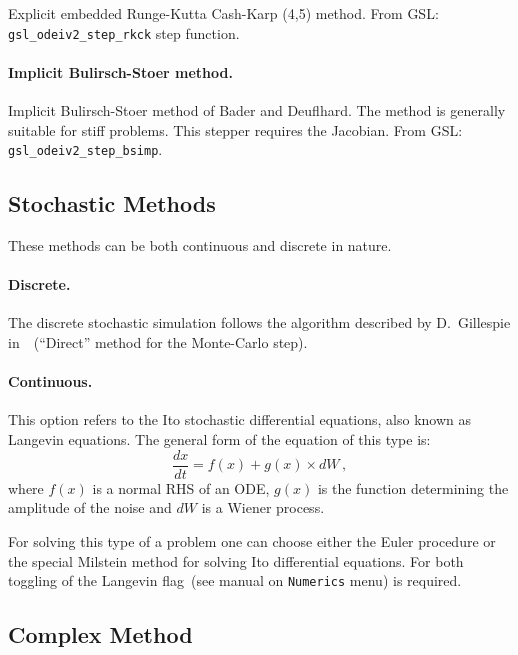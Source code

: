 \documentclass[11pt,a4paper]{article}
\begin{document}
Explicit embedded Runge-Kutta Cash-Karp (4,5) method. From GSL:
\texttt{gsl\_odeiv2\_step\_rkck} step function.

\paragraph{Implicit Bulirsch-Stoer method.}
\label{sec:impl-bulirsch-stoer}

Implicit Bulirsch-Stoer method of Bader and Deuflhard. The method is generally
suitable for stiff problems. This stepper requires the Jacobian. From GSL:
\texttt{gsl\_odeiv2\_step\_bsimp}.

\subsection{Stochastic Methods}
\label{sec:stochastic-methods}

These methods can be both continuous and discrete in nature.

\paragraph{Discrete.}
\label{sec:discrete}

The discrete stochastic simulation follows the algorithm described by D.~Gillespie
in~\cite{GillAlg}~(``Direct'' method for the Monte-Carlo step).

\paragraph{Continuous.}
\label{sec:continuous}

This option refers to the Ito stochastic differential equations, also known as
Langevin equations. The general form of the equation of this type is:
\begin{equation}
  \label{eq:lang_eq_general_type}
  \frac{dx}{dt} = f(x) + g(x)\times dW\,,
\end{equation}
where $f(x)$ is a normal RHS of an ODE, $g(x)$ is the function determining the
amplitude of the noise and $dW$ is a Wiener process.

For solving this type of a problem one can choose either the Euler procedure or
the special Milstein method for solving Ito differential equations. For both toggling
of the Langevin flag~(see manual on \texttt{Numerics} menu) is required.

\subsection{Complex Method}
\label{sec:complex-method}
\end{document}
